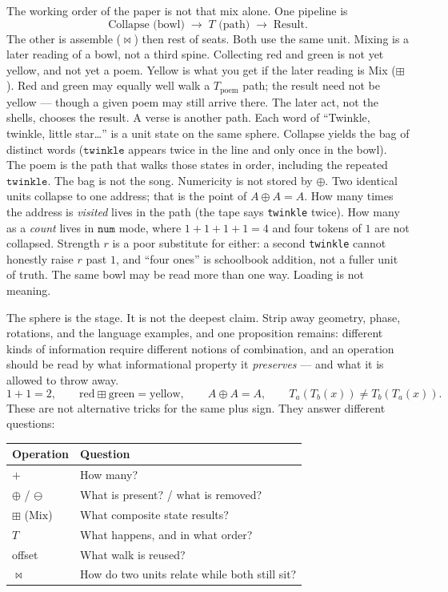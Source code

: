 \documentclass[12pt, a4paper]{article}
\begin{document}
The working order of the paper is not that mix alone. One pipeline is
\[
\text{Collapse (bowl)} \;\longrightarrow\; T\text{ (path)} \;\longrightarrow\; \text{Result}.
\]
The other is assemble ($\bowtie$) then rest of seats. Both use the
same unit. Mixing is a later reading of a bowl, not a third spine.
Collecting red and green is not yet yellow, and not yet a poem.
Yellow is what you get if the later reading is Mix ($\boxplus$).
Red and green may equally well walk a $T_{\mathrm{poem}}$ path; the
result need not be yellow --- though a given poem may still arrive
there. The later act, not the shells, chooses the result. A verse is
another path.
Each word of ``Twinkle, twinkle, little star\ldots'' is a unit state
on the same sphere. Collapse yields the bag of distinct words
($\texttt{twinkle}$ appears twice in the line and only once in the
bowl). The poem is the path that walks those states in order,
including the repeated $\texttt{twinkle}$. The bag is not the song.
Numericity is not stored by $\oplus$. Two identical units collapse
to one address; that is the point of $A\oplus A=A$. How many times
the address is \emph{visited} lives in the path (the tape says
\texttt{twinkle} twice). How many as a \emph{count} lives in
$\mathtt{num}$ mode, where $1+1+1+1=4$ and four tokens of $1$ are
not collapsed. Strength $r$ is a poor substitute for either: a
second \texttt{twinkle} cannot honestly raise $r$ past $1$, and
``four ones'' is schoolbook addition, not a fuller unit of truth.
The same bowl may be read more than one way. Loading is not meaning.

The sphere is the stage. It is not the deepest claim. Strip away
geometry, phase, rotations, and the language examples, and one
proposition remains: different kinds of information require different
notions of combination, and an operation should be read by what
informational property it \emph{preserves} --- and what it is allowed
to throw away.
\[
1+1=2,
\qquad
\mathrm{red}\boxplus\mathrm{green}=\mathrm{yellow},
\qquad
A\oplus A=A,
\qquad
T_a(T_b(x))\neq T_b(T_a(x)).
\]
These are not alternative tricks for the same plus sign. They answer
different questions:

\begin{center}
\begin{tabular}{ll}
Operation & Question \\
\hline
$+$ & How many? \\
$\oplus$ / $\ominus$ & What is present? / what is removed? \\
$\boxplus$ ($\mathrm{Mix}$) & What composite state results? \\
$T$ & What happens, and in what order? \\
offset & What walk is reused? \\
$\bowtie$ & How do two units relate while both still sit? \\
\end{tabular}
\end{center}
\end{document}

